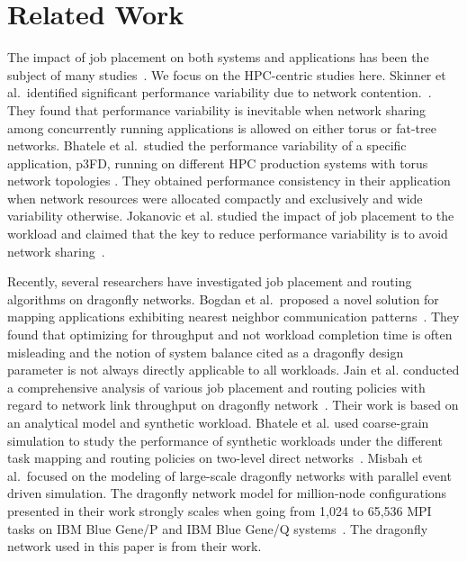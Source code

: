 \section{Related Work}
\label{sec:related work}

The impact of job placement on both systems and applications has been the subject of many studies~\cite{dskinner,abhinav-sc13,jose-ipdps15}. We focus on the HPC-centric studies here. Skinner et al.\ identified significant performance variability due to network contention.~\cite{dskinner}. They found that performance variability is inevitable when network sharing among concurrently running applications is allowed on either torus or fat-tree networks.
Bhatele et al.\ studied the performance variability of a specific application, p3FD, running on different HPC production systems with torus network topologies \cite{abhinav-sc13}. They obtained performance consistency in their application when network resources were allocated compactly and exclusively and wide variability otherwise. Jokanovic et al. studied the impact of job placement to the workload and claimed that the key to reduce performance variability is to avoid network sharing~\cite{jose-ipdps15}. 

Recently, several researchers have investigated job placement and routing algorithms on dragonfly networks. Bogdan et al.\ proposed a novel solution for mapping applications exhibiting nearest neighbor communication patterns~\cite{hoefler-hpdc14}. They found that optimizing for throughput and not workload completion time is often misleading and the notion of system balance cited as a dragonfly design parameter is not always directly applicable to all workloads.
Jain et al. conducted a comprehensive analysis of various job placement and routing policies with regard to network link throughput on dragonfly network~\cite{jain-sc14}. Their work is based on an analytical model and synthetic workload. Bhatele et al. used coarse-grain simulation to study the performance of synthetic workloads under the different task mapping and routing policies on two-level direct networks~\cite{bhatele-sc11}. Misbah et al.\ focused on  the modeling of large-scale dragonfly networks with parallel event driven simulation. The dragonfly network model for million-node configurations presented in their work strongly scales when going from 1,024 to 65,536 MPI tasks on IBM Blue Gene/P and IBM Blue Gene/Q systems~\cite{codes-dragonfly}. The dragonfly network used in this paper is from their work. 

